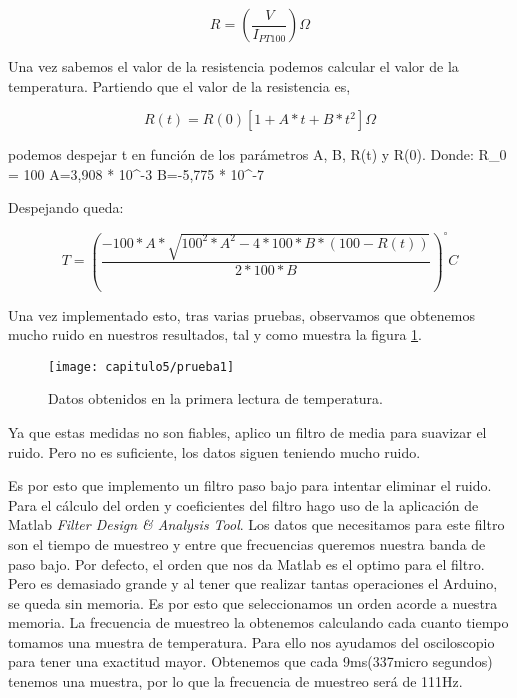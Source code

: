 \begin{equation}
R=\left(\frac{V}{I_{PT100}}\right) \Omega 
\end{equation}

Una vez sabemos el valor de la resistencia podemos calcular el valor de la temperatura. Partiendo que el valor de la resistencia es,

\begin{equation}
R(t)=R(0)[1+A*t+B*t^{2}] \Omega 
\end{equation}

podemos despejar t en función de los parámetros A, B, R(t) y R(0). Donde:
\newline
\newline
 R_0 = 100 \Omega
\newline
A=3,908 * 10^{-3}
\newline
B=-5,775 * 10^{-7}

Despejando queda: 

\begin{equation}
T=\left(\frac{-100*A*\sqrt{100^2*A^2-4*100*B*(100-R(t))}}{2*100*B}\right) ^{\circ}C
\end{equation}


Una vez implementado esto, tras varias pruebas, observamos que obtenemos mucho ruido en nuestros resultados, tal y como muestra la figura \ref{fig:prueba1}.

\smallskip
\begin{figure}[H]%
\noindent \begin{centering}
\texttt{[image: capitulo5/prueba1]}
\par\end{centering}
\caption{\label{fig:prueba1} Datos obtenidos en la primera lectura de temperatura.}
\end{figure}
\smallskip

Ya que estas medidas no son fiables, aplico un filtro de media para suavizar el ruido. Pero no es suficiente, los datos siguen teniendo mucho ruido.  

Es por esto que implemento un filtro  paso bajo para intentar eliminar el ruido. Para el cálculo del orden y coeficientes del filtro  hago uso de la aplicación de Matlab \textit{Filter Design & Analysis Tool}. 
Los datos que necesitamos para este filtro son el tiempo de muestreo y entre que frecuencias queremos nuestra banda de paso bajo. Por defecto, el orden que nos da Matlab es el optimo para el filtro. Pero es demasiado grande y al tener que realizar tantas operaciones el Arduino, se queda sin memoria. Es por esto que seleccionamos un orden acorde a nuestra memoria. La frecuencia de muestreo la obtenemos calculando cada cuanto tiempo tomamos una muestra de temperatura. Para ello nos ayudamos del osciloscopio para tener una exactitud mayor. Obtenemos que cada 9ms(337micro segundos) tenemos una muestra, por lo que la frecuencia de muestreo será de 111Hz.

